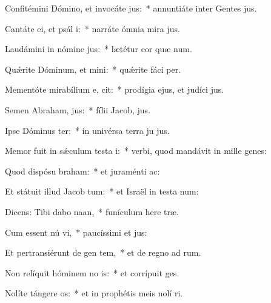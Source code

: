 \item Confitémini Dómino, et invocáte  jus:~* annuntiáte inter Gentes  jus.
\item Cantáte ei, et psál i:~* narráte ómnia mira jus.
\item Laudámini in nómine  jus:~* lætétur cor quæ num.
\item Quǽrite Dóminum, et mini:~* quǽrite fáci  per.
\item Mementóte mirabílium e,  cit:~* prodígia ejus, et judíci  jus.
\item Semen Abraham,  jus:~* fílii Jacob,  jus.
\item Ipse Dóminus  ter:~* in univérsa terra ju jus.
\item Memor fuit in sǽculum testa i:~* verbi, quod mandávit in mille genes:
\item Quod dispósu  braham:~* et juraménti   ac:
\item Et státuit illud Jacob  tum:~* et Israël in testa num:
\item Dicens: Tibi dabo  naan,~* funículum here træ.
\item Cum essent nú vi,~* paucíssimi et  jus:
\item Et pertransiérunt de gen  tem,~* et de regno ad  rum.
\item Non relíquit hóminem no is:~* et corrípuit   ges.
\item Nolíte tángere  os:~* et in prophétis meis nolí ri.

